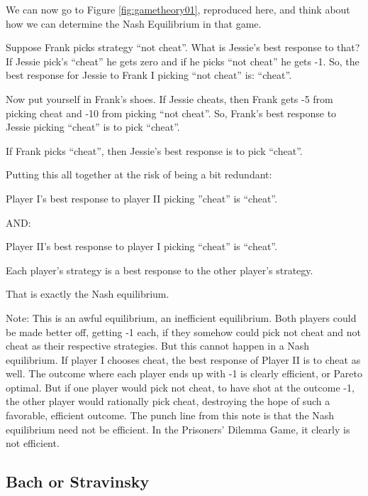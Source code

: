 \documentclass[
]{book}
\begin{document}
We can now go to Figure \ref{fig:gametheory01}, reproduced here, and think about how we can determine the Nash Equilibrium in that game.

Suppose Frank picks strategy ``not cheat''. What is Jessie's best response to that? If Jessie pick's ``cheat'' he gets zero and if he picks ``not cheat'' he gets -1. So, the best response for Jessie to Frank I picking ``not cheat'' is: ``cheat''.

Now put yourself in Frank's shoes. If Jessie cheats, then Frank gets -5 from picking cheat and -10 from picking ``not cheat''. So, Frank's best response to Jessie picking ``cheat'' is to pick ``cheat''.

If Frank picks ``cheat'', then Jessie's best response is to pick ``cheat''.

Putting this all together at the risk of being a bit redundant:

\begin{center}
Player I's best response to player II picking ''cheat'' is ``cheat''.

AND:

Player II's best response to player I picking ``cheat'' is ``cheat''.

\end{center}

Each player's strategy is a best response to the other player's strategy.

That is exactly the Nash equilibrium.

Note: This is an awful equilibrium, an inefficient equilibrium. Both players could be made better off, getting -1 each, if they somehow could pick not cheat and not cheat as their respective strategies. But this cannot happen in a Nash equilibrium. If player I chooses cheat, the best response of Player II is to cheat as well. The outcome where each player ends up with -1 is clearly efficient, or Pareto optimal. But if one player would pick not cheat, to have shot at the outcome -1, the other player would rationally pick cheat, destroying the hope of such a favorable, efficient outcome. The punch line from this note is that the Nash equilibrium need not be efficient. In the Prisoners' Dilemma Game, it clearly is not efficient.

\hypertarget{bach-or-stravinsky}{%
\subsection{Bach or Stravinsky}\label{bach-or-stravinsky}}
\end{document}
